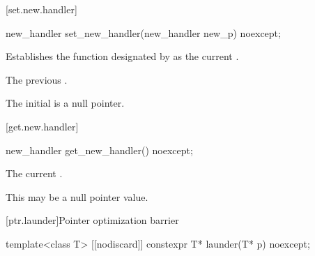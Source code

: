[set.new.handler]{}

%
\begin{itemdecl}
new_handler set_new_handler(new_handler new_p) noexcept;
\end{itemdecl}

\begin{itemdescr}
\pnum
\effects
Establishes the function designated by  as the current
.

\pnum
\returns
The previous .

\pnum
\remarks
The initial  is a null pointer.
\end{itemdescr}

[get.new.handler]{}

%
\begin{itemdecl}
new_handler get_new_handler() noexcept;
\end{itemdecl}

\begin{itemdescr}
\pnum
\returns The current .
\begin{note} This may be a null pointer value. \end{note}
\end{itemdescr}

[ptr.launder]{Pointer optimization barrier}

%
\begin{itemdecl}
template<class T> [[nodiscard]] constexpr T* launder(T* p) noexcept;
\end{itemdecl}


